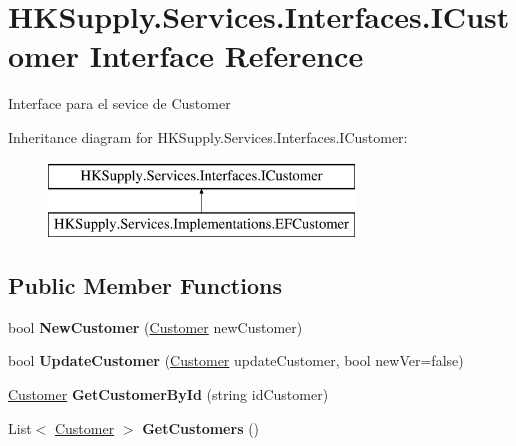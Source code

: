 \hypertarget{interface_h_k_supply_1_1_services_1_1_interfaces_1_1_i_customer}{}\section{H\+K\+Supply.\+Services.\+Interfaces.\+I\+Customer Interface Reference}
\label{interface_h_k_supply_1_1_services_1_1_interfaces_1_1_i_customer}


Interface para el sevice de Customer  


Inheritance diagram for H\+K\+Supply.\+Services.\+Interfaces.\+I\+Customer\+:\begin{figure}[H]
\begin{center}
\leavevmode
\includegraphics[height=2.000000cm]{interface_h_k_supply_1_1_services_1_1_interfaces_1_1_i_customer}
\end{center}
\end{figure}
\subsection*{Public Member Functions}
\begin{DoxyCompactItemize}
\item 
\mbox{\label{interface_h_k_supply_1_1_services_1_1_interfaces_1_1_i_customer_a4eae770f8e05c2a16b30d11ca2b6a3e8}} 
bool {\bfseries New\+Customer} (\hyperlink{class_h_k_supply_1_1_models_1_1_customer}{Customer} new\+Customer)
\item 
\mbox{\label{interface_h_k_supply_1_1_services_1_1_interfaces_1_1_i_customer_a2f446e665b10feef3e8373887a138048}} 
bool {\bfseries Update\+Customer} (\hyperlink{class_h_k_supply_1_1_models_1_1_customer}{Customer} update\+Customer, bool new\+Ver=false)
\item 
\mbox{\label{interface_h_k_supply_1_1_services_1_1_interfaces_1_1_i_customer_a0ce0dce4e042cf94014fbc1487bf7789}} 
\hyperlink{class_h_k_supply_1_1_models_1_1_customer}{Customer} {\bfseries Get\+Customer\+By\+Id} (string id\+Customer)
\item 
\mbox{\label{interface_h_k_supply_1_1_services_1_1_interfaces_1_1_i_customer_a9191f24189f44e76aad505edfdf7e057}} 
List$<$ \hyperlink{class_h_k_supply_1_1_models_1_1_customer}{Customer} $>$ {\bfseries Get\+Customers} ()
\end{DoxyCompactItemize}


